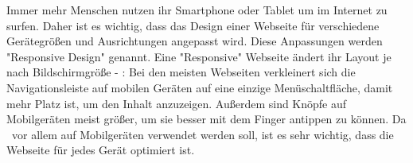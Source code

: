 
Immer mehr Menschen nutzen ihr Smartphone oder Tablet um im Internet zu surfen. 
Daher ist es wichtig, dass das Design einer Webseite für verschiedene Gerätegrößen und Ausrichtungen angepasst wird. 
Diese Anpassungen werden "Responsive Design" genannt. 
Eine "Responsive" Webseite ändert ihr Layout je nach Bildschirmgröße - \zb: 
Bei den meisten Webseiten verkleinert sich die Navigationsleiste auf mobilen Geräten auf eine einzige Menüschaltfläche, damit mehr Platz ist, um den Inhalt anzuzeigen. 
Außerdem sind Knöpfe auf Mobilgeräten meist größer, um sie besser mit dem Finger antippen zu können. 
Da \ZELIA\ vor allem auf Mobilgeräten verwendet werden soll, ist es sehr wichtig, dass die Webseite für jedes Gerät optimiert ist. 

